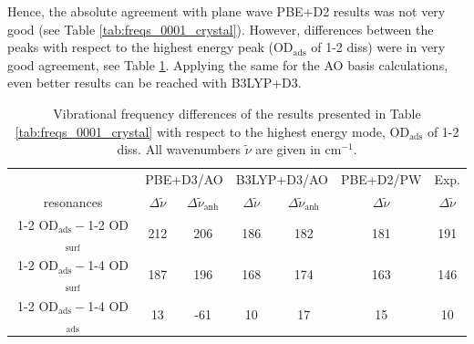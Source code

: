 \documentclass[11pt,DIV=13,BCOR=5mm,a4paper,headinclude]{scrbook}
\begin{document}
Hence, the absolute agreement with plane wave PBE+D2 results was not very good (see Table \ref{tab:freqs_0001_crystal}).
However, differences between the peaks with respect to the highest energy peak (OD$_\textrm{ads}$ of 1-2 diss) were in very good agreement, see Table \ref{tab:freqs_0001_crystal-relative}.
Applying the same for the AO basis calculations, even better results can be reached with B3LYP+D3.
\begin{table}[!h]
  \centering
  \caption{Vibrational frequency differences of the results presented in Table \ref{tab:freqs_0001_crystal} with respect to the highest energy mode, OD$_\textrm{ads}$ of 1-2 diss.
All wavenumbers $\tilde{\nu}$ are given in cm$^{-1}$.}
  \begin{tabular}{c|cc|cc|c|c}
  \toprule
   & \multicolumn{2}{c}{PBE+D3/AO} & \multicolumn{2}{c}{B3LYP+D3/AO} &PBE+D2/PW&Exp.\cite{Wirth2014}\\
   resonances & $\Delta\tilde{\nu}$ & $\Delta\tilde{\nu}_\textrm{anh}$ & $\Delta\tilde{\nu}$ & $\Delta\tilde{\nu}_\textrm{anh}$ & $\Delta\tilde{\nu}$ & $\Delta\tilde{\nu}$\\\midrule
  1-2 OD$_\textrm{ads}-$1-2 OD$_\textrm{surf}$&212 &206 &186 &182 &181 &191 \\
  1-2 OD$_\textrm{ads}-$1-4 OD$_\textrm{surf}$&187 &196 &168 &174 &163 &146 \\
  1-2 OD$_\textrm{ads}-$1-4 OD$_\textrm{ads}$ &13 &-61 &10 &17 &15 &10 \\\bottomrule
    \end{tabular}
  \label{tab:freqs_0001_crystal-relative}
\end{table}
\end{document}
